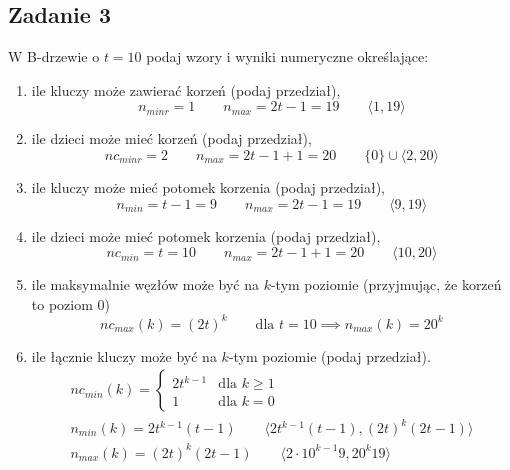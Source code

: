 \documentclass{article}
\begin{document}
\subsection*{Zadanie 3}
W B-drzewie o $t=10$ podaj wzory i wyniki numeryczne określające:
\begin{enumerate}[label=(\alph*)]
    \item ile kluczy może zawierać korzeń (podaj przedział),
          \begin{equation*}
              n_{minr} = 1 \qquad n_{max} = 2t-1 = 19 \qquad \langle 1, 19 \rangle
          \end{equation*}
    \item ile dzieci może mieć korzeń (podaj przedział),
          \begin{equation*}
              nc_{minr} = 2 \qquad n_{max} = 2t-1+1 = 20 \qquad \{0\} \cup \langle 2, 20 \rangle
          \end{equation*}
    \item ile kluczy może mieć potomek korzenia (podaj przedział),
          \begin{equation*}
              n_{min} = t-1 = 9 \qquad n_{max} = 2t-1 = 19 \qquad \langle 9, 19 \rangle
          \end{equation*}
    \item ile dzieci może mieć potomek korzenia (podaj przedział),
          \begin{equation*}
              nc_{min} = t = 10 \qquad n_{max} = 2t-1+1 = 20 \qquad \langle 10, 20 \rangle
          \end{equation*}
    \item ile maksymalnie węzłów może być na $k$-tym poziomie (przyjmując, że korzeń to poziom $0$)
          \begin{equation*}
              nc_{max}(k) = (2t)^k \qquad \text{dla } t=10 \implies n_{max}(k) = 20^k
          \end{equation*}
    \item ile łącznie kluczy może być na $k$-tym poziomie (podaj przedział).
          \begin{gather*}
              nc_{min}(k) = \begin{cases}
                  2t^{k-1} & \text{dla } k \geq 1 \\
                  1        & \text{dla } k = 0
              \end{cases}\\
              n_{min}(k) = 2t^{k-1}(t-1) \qquad \langle 2t^{k-1}(t-1), (2t)^k(2t-1) \rangle \\
              n_{max}(k) = (2t)^k(2t-1) \qquad \langle 2 \cdot 10^{k-1}9, 20^k19 \rangle
          \end{gather*}
\end{enumerate}
\end{document}
